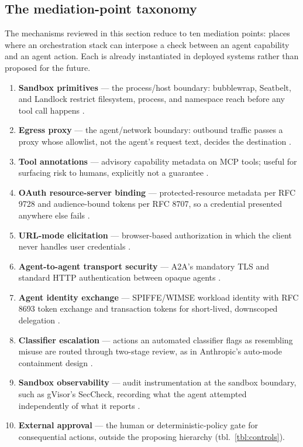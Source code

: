 \documentclass[
  english,
  9pt,
]{extarticle}
\providecommand{\tightlist}{%
  \setlength{\itemsep}{0pt}\setlength{\parskip}{0pt}}
\begin{document}
\subsection{The mediation-point
taxonomy}\label{the-mediation-point-taxonomy}

The mechanisms reviewed in this section reduce to ten mediation points:
places where an orchestration stack can interpose a check between an
agent capability and an agent action. Each is already instantiated in
deployed systems rather than proposed for the future.

\begin{enumerate}
\def\labelenumi{\arabic{enumi}.}
\tightlist
\item
  \textbf{Sandbox primitives} --- the process/host boundary: bubblewrap,
  Seatbelt, and Landlock restrict filesystem, process, and namespace
  reach before any tool call happens
  \citep{anthropic_sandboxing, codex_sandboxing, linux_landlock_docs}.
\item
  \textbf{Egress proxy} --- the agent/network boundary: outbound traffic
  passes a proxy whose allowlist, not the agent's request text, decides
  the destination \citep{anthropic_sandboxing}.
\item
  \textbf{Tool annotations} --- advisory capability metadata on MCP
  tools; useful for surfacing risk to humans, explicitly not a guarantee
  \citep{mcp_tools_annotations}.
\item
  \textbf{OAuth resource-server binding} --- protected-resource metadata
  per RFC 9728 and audience-bound tokens per RFC 8707, so a credential
  presented anywhere else fails \citep{mcp_spec_changelog}.
\item
  \textbf{URL-mode elicitation} --- browser-based authorization in which
  the client never handles user credentials \citep{mcp_spec_2025_11}.
\item
  \textbf{Agent-to-agent transport security} --- A2A's mandatory TLS and
  standard HTTP authentication between opaque agents
  \citep{a2a_protocol}.
\item
  \textbf{Agent identity exchange} --- SPIFFE/WIMSE workload identity
  with RFC 8693 token exchange and transaction tokens for short-lived,
  downscoped delegation \citep{ietf_agent_identity}.
\item
  \textbf{Classifier escalation} --- actions an automated classifier
  flags as resembling misuse are routed through two-stage review, as in
  Anthropic's auto-mode containment design
  \citep{claude_code_auto_mode}.
\item
  \textbf{Sandbox observability} --- audit instrumentation at the
  sandbox boundary, such as gVisor's SecCheck, recording what the agent
  attempted independently of what it reports \citep{gvisor_seccheck}.
\item
  \textbf{External approval} --- the human or deterministic-policy gate
  for consequential actions, outside the proposing hierarchy
  (tbl.~\ref{tbl:controls}).
\end{enumerate}
\end{document}
